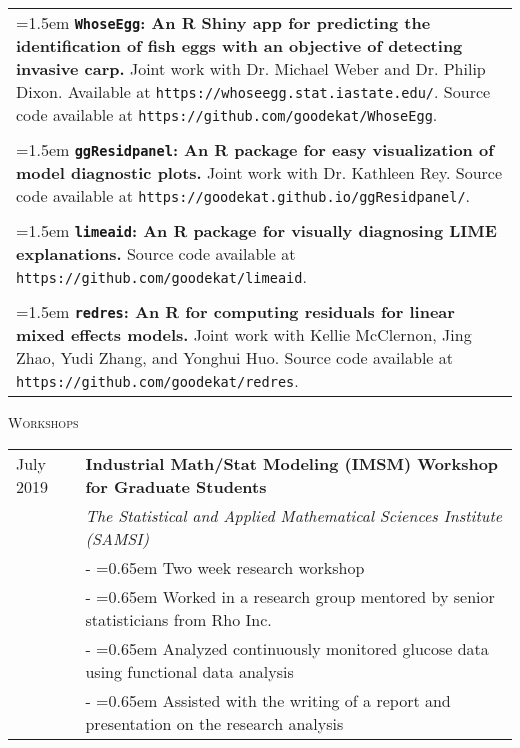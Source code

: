 \documentclass[10pt, oneside]{article}
\begin{document}
\begin{longtable}{p{16.5cm}}
\hangindent=1.5em \textbf{\texttt{WhoseEgg}: An R Shiny app for predicting the identification of fish eggs with an objective of detecting invasive carp.} Joint work with Dr. Michael Weber and Dr. Philip Dixon. Available at \texttt{https://whoseegg.stat.iastate.edu/}. Source code available at \texttt{https://github.com/goodekat/WhoseEgg}.\\
\\
\hangindent=1.5em \textbf{\texttt{ggResidpanel}: An R package for easy visualization of model diagnostic plots.} Joint work with Dr. Kathleen Rey. Source code available at \texttt{https://goodekat.github.io/ggResidpanel/}.\\
\\
\hangindent=1.5em \textbf{\texttt{limeaid}: An R package for visually diagnosing LIME explanations.} Source code available at \texttt{https://github.com/goodekat/limeaid}.\\
\\
\hangindent=1.5em \textbf{\texttt{redres}: An R for computing residuals for linear mixed effects models.} Joint work with Kellie McClernon, Jing Zhao, Yudi Zhang, and Yonghui Huo. Source code available at \texttt{https://github.com/goodekat/redres}.
\end{longtable}

\noindent \textsc{Workshops} \hrulefill

\begin{longtable}{p{3.5cm}p{13cm}}
\hfill{July 2019} & \textbf{Industrial Math/Stat Modeling (IMSM) Workshop for Graduate Students}\\
& \emph{The Statistical and Applied Mathematical Sciences Institute (SAMSI)} \vspace{0.1cm}\\
& - \hangindent=0.65em \hangafter=1 Two week research workshop\\
& - \hangindent=0.65em \hangafter=1 Worked in a research group mentored by senior statisticians from Rho Inc.\\
& - \hangindent=0.65em \hangafter=1 Analyzed continuously monitored glucose data using functional data analysis\\
& - \hangindent=0.65em \hangafter=1 Assisted with the writing of a report and presentation on the research analysis\\
\end{longtable}
\end{document}
